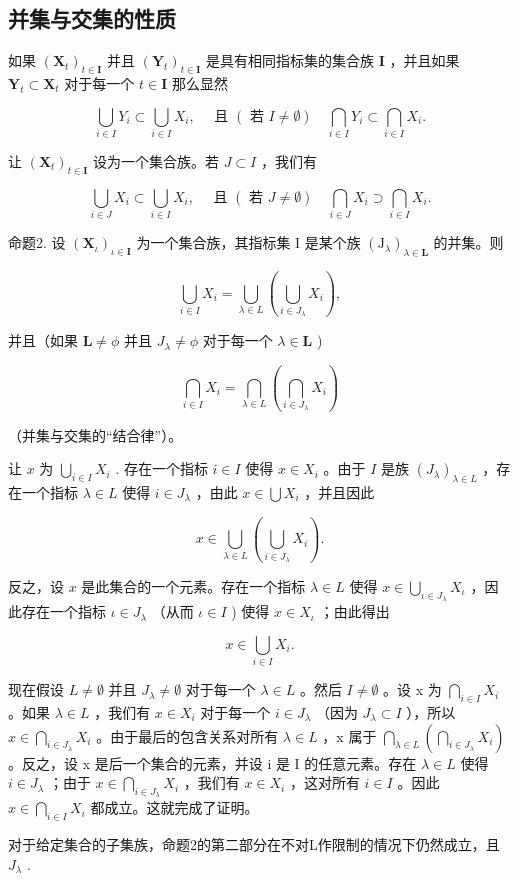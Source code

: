 \subsection{并集与交集的性质}

如果 \((\mathbf{X}_t)_{t\in \mathbf{I}}\) 并且 \((\mathbf{Y}_t)_{t\in \mathbf{I}}\) 是具有相同指标集的集合族 \(\mathbf{I}\) ，并且如果 \(\mathbf{Y}_t\subset \mathbf{X}_t\) 对于每一个 \(t\in \mathbf{I}\) 那么显然

\[
\bigcup_ {i \in I} Y _ {i} \subset \bigcup_ {i \in I} X _ {i}, \quad \text { 且 } (\text { 若   } I \neq \emptyset) \quad \bigcap_ {i \in I} Y _ {i} \subset \bigcap_ {i \in I} X _ {i}.
\]

让 \((\mathbf{X}_t)_{t\in \mathbf{I}}\) 设为一个集合族。若 \(J\subset I\) ，我们有

\[
\bigcup_ {i \in J} X _ {i} \subset \bigcup_ {i \in I} X _ {i}, \quad \text { 且 } (\text { 若 } J \neq \emptyset) \quad \bigcap_ {i \in J} X _ {i} \supset \bigcap_ {i \in I} X _ {i}.
\]

命题2. 设 \((\mathbf{X}_{\iota})_{\iota \in \mathbf{I}}\) 为一个集合族，其指标集 I 是某个族 \((\mathrm{J}_{\lambda})_{\lambda \in \mathbf{L}}\) 的并集。则

\[
\bigcup_ {i \in I} X _ {i} = \bigcup_ {\lambda \in L} \left(\bigcup_ {i \in J _ {\lambda}} X _ {i}\right),
\]

并且（如果 \(\mathbf{L} \neq \phi\) 并且 \(J_{\lambda} \neq \phi\) 对于每一个 \(\lambda \in \mathbf{L}\) )

\[
\bigcap_ {i \in I} X _ {i} = \bigcap_ {\lambda \in L} \left(\bigcap_ {i \in J _ {\lambda}} X _ {i}\right)
\]

（并集与交集的“结合律”）。

让 \(x\) 为 \(\bigcup_{i \in I} X_i\) . 存在一个指标 \(i \in I\) 使得 \(x \in X_i\) 。由于 \(I\) 是族 \((J_\lambda)_{\lambda \in L}\) ，存在一个指标 \(\lambda \in L\) 使得 \(i \in J_\lambda\) ，由此 \(x \in \bigcup X_i\) ，并且因此

\[
x \in \bigcup_ {\lambda \in L} \left(\bigcup_ {i \in J _ {\lambda}} X _ {i}\right).
\]

反之，设 \(x\) 是此集合的一个元素。存在一个指标 \(\lambda \in L\) 使得 \(x \in \bigcup_{\iota \in J_{\lambda}} X_{\iota}\) ，因此存在一个指标 \(\iota \in J_{\lambda}\) （从而 \(\iota \in I\) ) 使得 \(x \in X_{\iota}\) ；由此得出

\[
x \in \bigcup_ {i \in I} X _ {i}.
\]

现在假设 \(L \neq \emptyset\) 并且 \(J_{\lambda} \neq \emptyset\) 对于每一个 \(\lambda \in L\) 。然后 \(I \neq \emptyset\) 。设 x 为 \(\bigcap_{i \in I} X_{i}\) 。如果 \(\lambda \in L\) ，我们有 \(x \in X_{i}\) 对于每一个 \(i \in J_{\lambda}\) （因为 \(J_{\lambda} \subset I\) ），所以 \(x \in \bigcap_{i \in J_{\lambda}} X_{i}\) 。由于最后的包含关系对所有 \(\lambda \in L\) ，x 属于 \(\bigcap_{\lambda \in L} \left( \bigcap_{i \in J_{\lambda}} X_{i} \right)\) 。反之，设 x 是后一个集合的元素，并设 i 是 I 的任意元素。存在 \(\lambda \in L\) 使得 \(i \in J_{\lambda}\) ；由于 \(x \in \bigcap_{i \in J_{\lambda}} X_{i}\) ，我们有 \(x \in X_{i}\) ，这对所有 \(i \in I\) 。因此 \(x \in \bigcap_{i \in I} X_{i}\) 都成立。这就完成了证明。

对于给定集合的子集族，命题2的第二部分在不对L作限制的情况下仍然成立，且 \(J_{\lambda}\) .


